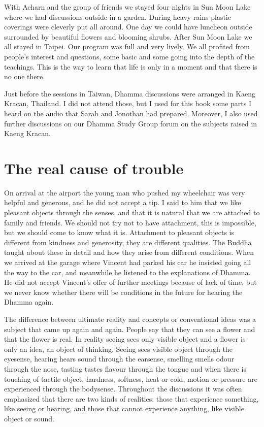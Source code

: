 \documentclass{book}
\begin{document}
With Acharn and the group of friends we stayed four nights in
Sun Moon Lake where we had discussions outside in a garden. During heavy
rains plastic coverings were cleverly put all around. One day we could
have luncheon outside surrounded by beautiful flowers and blooming
shrubs. After Sun Moon Lake we all stayed in Taipei. Our program was
full and very lively. We all profited from people's interest and
questions, some basic and some going into the depth of the teachings.
This is the way to learn that life is only in a moment and that there is
no one there.

Just before the sessions in Taiwan, Dhamma discussions were
arranged in Kaeng Kracan, Thailand. I did not attend those, but I used
for this book some parts I heard on the audio that Sarah and Jonothan
had prepared. Moreover, I also used further discussions on our Dhamma
Study Group forum on the subjects raised in Kaeng Kracan. 



\section*{The real cause of trouble}

On arrival at the airport the young man who pushed my
wheelchair was very helpful and generous, and he did not accept a tip. I
said to him that we like pleasant objects through the senses, and that
it is natural that we are attached to family and friends. We should not
try not to have attachment, this is impossible, but we should come to
know what it is. Attachment to pleasant objects is different from
kindness and generosity, they are different qualities. The Buddha taught
about these in detail and how they arise from different conditions. When
we arrived at the garage where Vincent had parked his car he insisted
going all the way to the car, and meanwhile he listened to the
explanations of Dhamma. He did not accept Vincent's offer of further
meetings because of lack of time, but we never know whether there will
be conditions in the future for hearing the Dhamma again. 

The difference between ultimate reality and concepts or
conventional ideas was a subject that came up again and again. People
say that they can see a flower and that the flower is real. In reality
seeing sees only visible object and a flower is only an idea, an object
of thinking. Seeing sees visible object through the eyesense, hearing
hears sound through the earsense, smelling smells odour through the
nose, tasting tastes flavour through the tongue and when there is
touching of tactile object, hardness, softness, heat or cold, motion or
pressure are experienced through the bodysense. Throughout the
discussions it was often emphasized that there are two kinds of
realities: those that experience something, like seeing or hearing, and
those that cannot experience anything, like visible object or sound. 
\end{document}
